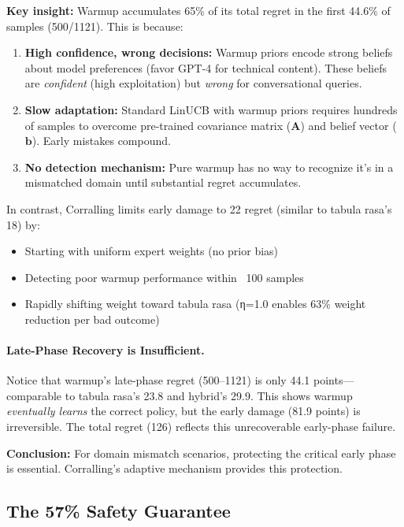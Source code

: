 \textbf{Key insight:} Warmup accumulates 65\% of its total regret in the first 44.6\% of samples (500/1121). This is because:
\begin{enumerate}[leftmargin=*,nosep]
    \item \textbf{High confidence, wrong decisions:} Warmup priors encode strong beliefs about model preferences (favor GPT-4 for technical content). These beliefs are \emph{confident} (high exploitation) but \emph{wrong} for conversational queries.
    \item \textbf{Slow adaptation:} Standard LinUCB with warmup priors requires hundreds of samples to overcome pre-trained covariance matrix ($\mathbf{A}$) and belief vector ($\mathbf{b}$). Early mistakes compound.
    \item \textbf{No detection mechanism:} Pure warmup has no way to recognize it's in a mismatched domain until substantial regret accumulates.
\end{enumerate}

In contrast, Corralling limits early damage to 22 regret (similar to tabula rasa's 18) by:
\begin{itemize}[leftmargin=*,nosep]
    \item Starting with uniform expert weights (no prior bias)
    \item Detecting poor warmup performance within ~100 samples
    \item Rapidly shifting weight toward tabula rasa (η=1.0 enables 63\% weight reduction per bad outcome)
\end{itemize}

\paragraph{Late-Phase Recovery is Insufficient.}
Notice that warmup's late-phase regret (500--1121) is only 44.1 points—comparable to tabula rasa's 23.8 and hybrid's 29.9. This shows warmup \emph{eventually learns} the correct policy, but the early damage (81.9 points) is irreversible. The total regret (126) reflects this unrecoverable early-phase failure.

\textbf{Conclusion:} For domain mismatch scenarios, protecting the critical early phase is essential. Corralling's adaptive mechanism provides this protection.

\subsection{The 57\% Safety Guarantee}

